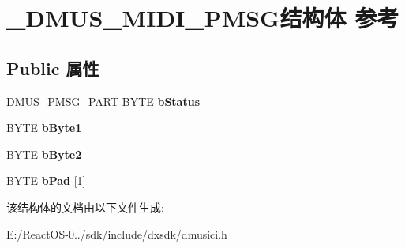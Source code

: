 \hypertarget{struct___d_m_u_s___m_i_d_i___p_m_s_g}{}\section{\+\_\+\+D\+M\+U\+S\+\_\+\+M\+I\+D\+I\+\_\+\+P\+M\+S\+G结构体 参考}
\label{struct___d_m_u_s___m_i_d_i___p_m_s_g}
\subsection*{Public 属性}
\begin{DoxyCompactItemize}
\item 
\mbox{\label{struct___d_m_u_s___m_i_d_i___p_m_s_g_a34f2afab7591ebe2f665e808c973d904}} 
D\+M\+U\+S\+\_\+\+P\+M\+S\+G\+\_\+\+P\+A\+RT B\+Y\+TE {\bfseries b\+Status}
\item 
\mbox{\label{struct___d_m_u_s___m_i_d_i___p_m_s_g_a3184f1858ee1efa68c8b0a55f2d0587a}} 
B\+Y\+TE {\bfseries b\+Byte1}
\item 
\mbox{\label{struct___d_m_u_s___m_i_d_i___p_m_s_g_aa7b0515ea8401d550fa01e79b5072485}} 
B\+Y\+TE {\bfseries b\+Byte2}
\item 
\mbox{\label{struct___d_m_u_s___m_i_d_i___p_m_s_g_aa4f3369e0d655af735827e607922ecbc}} 
B\+Y\+TE {\bfseries b\+Pad} \mbox{[}1\mbox{]}
\end{DoxyCompactItemize}


该结构体的文档由以下文件生成\+:\begin{DoxyCompactItemize}
\item 
E\+:/\+React\+O\+S-\/0../sdk/include/dxsdk/dmusici.\+h\end{DoxyCompactItemize}
